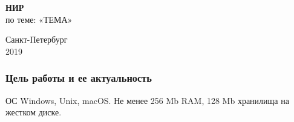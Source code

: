\documentclass[10pt,pdf,hyperref={unicode}]{beamer}
\begin{document}
    \begin{center}
    {
    \vspace{5cm}
    \LARGE \textbf{НИР} \\[3ex]
    по теме: «ТЕМА»
    }
    \end{center}

    \vfill

    \begin{center}
        Санкт-Петербург\\
        2019
    \end{center}

    \begin{frame}
        \frametitle{Цель работы и ее актуальность}
        ОС Windows, Unix, macOS. Не менее 256 Mb RAM, 128 Mb хранилища на жестком диске.
    \end{frame}
\end{document}
